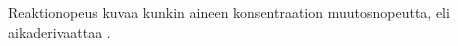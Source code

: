 Reaktionopeus kuvaa kunkin aineen konsentraation muutosnopeutta, eli aikaderivaattaa \cite[s. 24-26]{chemical_reaction_kinetics}. 

